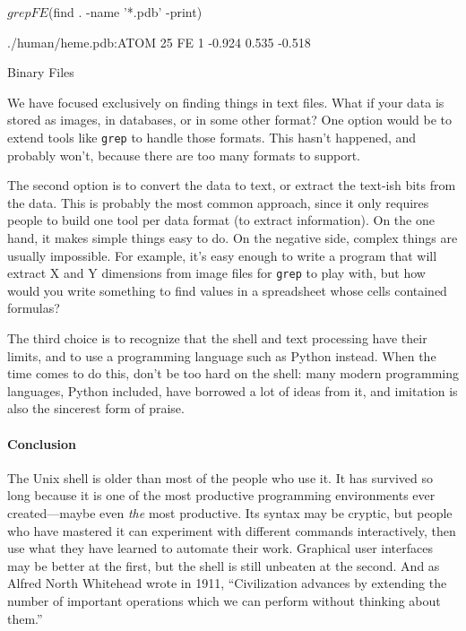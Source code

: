 \documentclass{book}
\begin{document}
\begin{VerbIn}
$ grep FE $(find . -name '*.pdb' -print)
\end{VerbIn}

\begin{VerbOut}
./human/heme.pdb:ATOM  25  FE  1  -0.924  0.535  -0.518
\end{VerbOut}

\begin{swcbox}{Binary Files}

We have focused exclusively on finding things in text files. What if
your data is stored as images, in databases, or in some other format?
One option would be to extend tools like \texttt{grep} to handle those
formats. This hasn't happened, and probably won't, because there are too
many formats to support.

The second option is to convert the data to text, or extract the
text-ish bits from the data. This is probably the most common approach,
since it only requires people to build one tool per data format (to
extract information). On the one hand, it makes simple things easy to
do. On the negative side, complex things are usually impossible. For
example, it's easy enough to write a program that will extract X and Y
dimensions from image files for \texttt{grep} to play with, but how
would you write something to find values in a spreadsheet whose cells
contained formulas?

The third choice is to recognize that the shell and text processing have
their limits, and to use a programming language such as Python instead.
When the time comes to do this, don't be too hard on the shell: many
modern programming languages, Python included, have borrowed a lot of
ideas from it, and imitation is also the sincerest form of praise.

\end{swcbox}

\mbox{}\paragraph{Conclusion}

The Unix shell is older than most of the people who use it. It has
survived so long because it is one of the most productive programming
environments ever created---maybe even \emph{the} most productive. Its
syntax may be cryptic, but people who have mastered it can experiment
with different commands interactively, then use what they have learned
to automate their work. Graphical user interfaces may be better at the
first, but the shell is still unbeaten at the second. And as Alfred
North Whitehead wrote in 1911, ``Civilization advances by extending the
number of important operations which we can perform without thinking
about them.''
\end{document}
